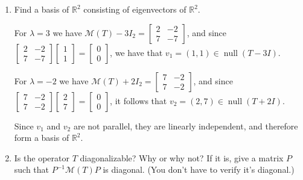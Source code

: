 \documentclass[12pt]{article}
\newcommand{\points}[1]{\marginpar{\hspace{24pt}[#1]}}
\newcommand{\R}{\mathbb{R}}
\DeclareMathOperator{\nul}{null}
\begin{document}
\begin{enumerate}
\begin{enumerate}
\bigskip

\item Find a basis of $\R^2$ consisting of eigenvectors of $\R^2$. \points{4}

\bigskip

For $\lambda = 3$ we have $\mathcal{M}(T)-3I_2 = \begin{bmatrix}2&-2\\7&-7\end{bmatrix}$, and since $\begin{bmatrix}2&-2\\7&-7\end{bmatrix}\begin{bmatrix}1\\1\end{bmatrix} = \begin{bmatrix}0\\0\end{bmatrix}$, we have that $v_1 = (1,1) \in \nul(T-3I)$.

For $\lambda = -2$ we have $\mathcal{M}(T)+2I_2 = \begin{bmatrix}7&-2\\7&-2\end{bmatrix}$, and since $\begin{bmatrix}7&-2\\7&-2\end{bmatrix}\begin{bmatrix}2\\7\end{bmatrix} = \begin{bmatrix}0\\0\end{bmatrix}$, it follows that $v_2 = (2,7)\in \nul(T+2I)$.

Since $v_1$ and $v_2$ are not parallel, they are linearly independent, and therefore form a basis of $\R^2$.

\bigskip

\item Is the operator $T$ diagonalizable? Why or why not? If it is, give a matrix $P$ such that $P^{-1}\mathcal{M}(T)P$ is diagonal. (You don't have to verify it's diagonal.) \points{2}

\bigskip


\end{enumerate}
\end{enumerate}
\end{document}
